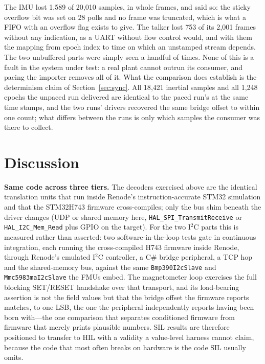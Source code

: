 \documentclass[preprint,12pt,a4paper]{elsarticle}
\newcommand{\code}[1]{\texttt{\small #1}}
\begin{document}
The IMU lost 1{,}589 of 20{,}010 samples, in whole frames, and said so: the
sticky overflow bit was set on 28 polls and no frame was truncated, which is
what a FIFO with an overflow flag exists to give. The talker lost 753 of its
2{,}001 frames without any indication, as a UART without flow control would,
and with them the mapping from epoch index to time on which an unstamped
stream depends. The two unbuffered parts were simply seen a handful of times.
None of this is a fault in the system under test: a real plant cannot outrun
its consumer, and pacing the importer removes all of it. What the comparison
does establish is the determinism claim of Section~\ref{sec:sync}. All
18{,}421 inertial samples and all 1{,}248 epochs the unpaced run delivered are
identical to the paced run's at the same time stamps, and the two runs' drivers
recovered the same bridge offset to within one count; what differs between the
runs is only which samples the consumer was there to collect.

\section{Discussion}
\label{sec:discussion}
\textbf{Same code across three tiers.} The decoders exercised above are the
identical translation units that run inside Renode's instruction-accurate STM32
simulation and that the STM32H743 firmware cross-compiles; only the bus shim beneath the
driver changes (UDP or shared memory here, \code{HAL\_SPI\_TransmitReceive} or
\code{HAL\_I2C\_Mem\_Read} plus GPIO on the target). For the two I$^2$C parts
this is measured rather than asserted: two software-in-the-loop tests gate in
continuous integration, each running the cross-compiled H743 firmware inside
Renode, through Renode's emulated I$^2$C controller, a C\# bridge peripheral, a
TCP hop and the shared-memory bus, against the same \code{Bmp390I2cSlave} and
\code{Mmc5983maI2cSlave} the FMUs embed. The magnetometer loop exercises the
full blocking SET/RESET handshake over that transport, and its load-bearing
assertion is not the field values but that the bridge offset the firmware
reports matches, to one LSB, the one the peripheral independently reports having
been born with---the one comparison that separates conditioned firmware from
firmware that merely prints plausible numbers. SIL results are therefore
positioned to transfer to HIL with a validity a value-level harness cannot claim, because the
code that most often breaks on hardware is the code SIL usually omits.
\end{document}
